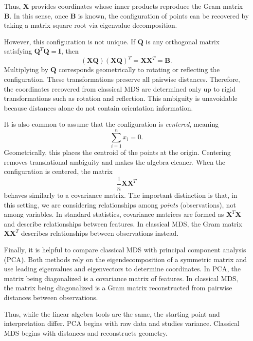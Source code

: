 Thus, $\mathbf{X}$ provides coordinates whose inner products reproduce
the Gram matrix $\mathbf{B}$. In this sense, once $\mathbf{B}$ is known,
the configuration of points can be recovered by taking a matrix square root
via eigenvalue decomposition.


However, this configuration is not unique. If $\mathbf{Q}$ is any orthogonal
matrix satisfying $\mathbf{Q}^T \mathbf{Q} = \mathbf{I}$, then
\[
(\mathbf{X}\mathbf{Q})(\mathbf{X}\mathbf{Q})^T
= \mathbf{X}\mathbf{X}^T
= \mathbf{B}.
\]
Multiplying by $\mathbf{Q}$ corresponds geometrically to rotating or reflecting
the configuration. These transformations preserve all pairwise distances.
Therefore, the coordinates recovered from classical MDS are determined only
up to rigid transformations such as rotation and reflection. This ambiguity
is unavoidable because distances alone do not contain orientation information.

\medskip

It is also common to assume that the configuration is \emph{centered}, meaning
\[
\sum_{i=1}^n x_i = 0.
\]
Geometrically, this places the centroid of the points at the origin. Centering removes translational ambiguity and makes the algebra cleaner. When the configuration is centered, the matrix
\[
\frac{1}{n} \mathbf{X}\mathbf{X}^T
\]
behaves similarly to a covariance matrix. The important distinction is that,
in this setting, we are considering relationships among \emph{points}
(observations), not among variables. In standard statistics, covariance matrices
are formed as $\mathbf{X}^T\mathbf{X}$ and describe relationships between
features. In classical MDS, the Gram matrix $\mathbf{X}\mathbf{X}^T$
describes relationships between observations instead.

\medskip

Finally, it is helpful to compare classical MDS with principal component
analysis (PCA). Both methods rely on the eigendecomposition of a symmetric
matrix and use leading eigenvalues and eigenvectors to determine coordinates.
In PCA, the matrix being diagonalized is a covariance matrix of features.
In classical MDS, the matrix being diagonalized is a Gram matrix reconstructed
from pairwise distances between observations.

Thus, while the linear algebra tools are the same, the starting point and
interpretation differ. PCA begins with raw data and studies variance.
Classical MDS begins with distances and reconstructs geometry.

\bigskip

